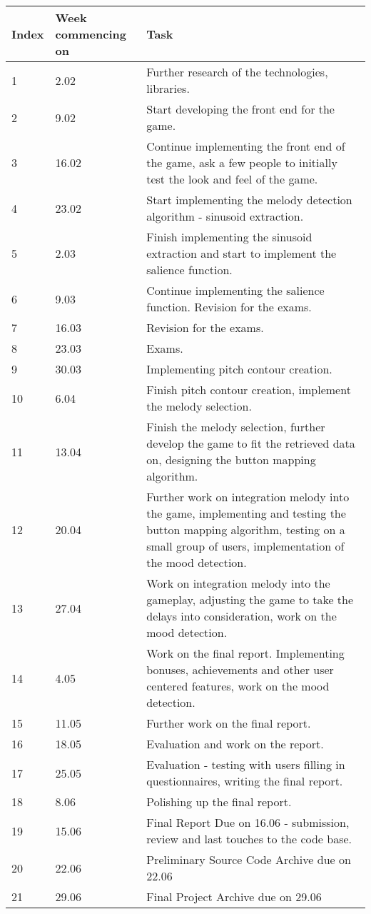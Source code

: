\begin{center}
\begin{tabular}{| l | l | p{9cm} |}
\hline
    Index & Week commencing on  & Task  \\ \hline
    1 & 2.02 & Further research of the technologies, libraries.\\ \hline
    2 & 9.02 & Start developing the front end for the game. \\ \hline
    3 & 16.02 & Continue implementing the front end of the game, ask a few people to initially test the look and feel of the game. \\ \hline
    4 & 23.02 & Start implementing the melody detection algorithm -  sinusoid extraction.\\ \hline
    5 & 2.03 & Finish implementing the sinusoid extraction and start to implement the salience function.\\ \hline
    6 & 9.03 & Continue implementing the salience function. Revision for the exams.\\ \hline
    7 & 16.03 & Revision for the exams. \\ \hline
    8 & 23.03 & Exams. \\ \hline
    9 & 30.03 & Implementing pitch contour creation. \\ \hline
    10 & 6.04 & Finish pitch contour creation, implement the melody selection. \\ \hline
    11 & 13.04 & Finish the melody selection, further develop the game to fit the retrieved data on, designing the button mapping algorithm. \\ \hline
    12 & 20.04 & Further work on integration melody into the game, implementing and testing the button mapping algorithm, testing on a small group of users, implementation of the mood detection. \\ \hline
    13 & 27.04 & Work on integration melody into the gameplay, adjusting the game to take the delays into consideration, work on the mood detection. \\ \hline
    14 & 4.05 & Work on the final report. Implementing bonuses, achievements and other user centered features, work on the mood detection. \\ \hline
    15 & 11.05 & Further work on the final report. \\ \hline
    16 & 18.05 & Evaluation and work on the report. \\ \hline
    17 & 25.05 & Evaluation - testing with users filling in questionnaires, writing the final report. \\ \hline
    18 & 8.06 & Polishing up the final report. \\ \hline
    19 & 15.06 & Final Report Due on 16.06 - submission, review and last touches to the code base.\\ \hline
    20 & 22.06 & Preliminary Source Code Archive due on 22.06\\ \hline
    21 & 29.06 & Final Project Archive due on 29.06\\ \hline
    
    \end{tabular}
\end{center}